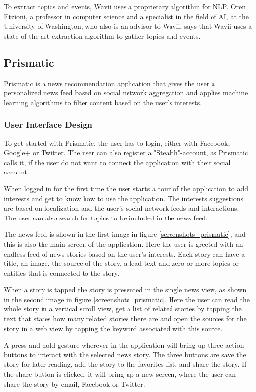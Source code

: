 To extract topics and events, Wavii uses a proprietary algorithm for NLP\cite{wavii_proprietary_algorithm}. Oren Etzioni, a professor in computer science and a specialist in the field of AI, at the University of Washington, who also is an advisor to Wavii, says that Wavii uses a state-of-the-art extraction algorithm to gather topics and events\cite{wavii_facebook_for_topics}.

\subsection{Prismatic}
Prismatic is a news recommendation application that gives the user a personalized news feed based on social network aggregation and applies machine learning algorithms to filter content based on the user's interests\cite{prismatic_wikipedia}.

\subsubsection{User Interface Design}
To get started with Prismatic, the user has to login, either with Facebook, Google+ or Twitter. The user can also register a "Stealth"-account, as Prismatic calls it, if the user do not want to connect the application with their social account.

When logged in for the first time the user starts a tour of the application to add interests and get to know how to use the application. The interests suggestions are based on localization and the user's social network feeds and interactions. The user can also search for topics to be included in the news feed.

The news feed is shown in the first image in figure \ref{screenshots_prismatic}, and this is also the main screen of the application. Here the user is greeted with an endless feed of news stories based on the user's interests. Each story can have a title, an image, the source of the story, a lead text and zero or more topics or entities that is connected to the story.

When a story is tapped the story is presented in the single news view, as shown in the second image in figure \ref{screenshots_prismatic}. Here the user can read the whole story in a vertical scroll view, get a list of related stories by tapping the text that states how many related stories there are and open the sources for the story in a web view by tapping the keyword associated with this source. 

A press and hold gesture wherever in the application will bring up three action buttons to interact with the selected news story. The three buttons are save the story for later reading, add the story to the favorites list, and share the story. If the share button is clicked, it will bring up a new screen, where the user can share the story by email, Facebook or Twitter.

